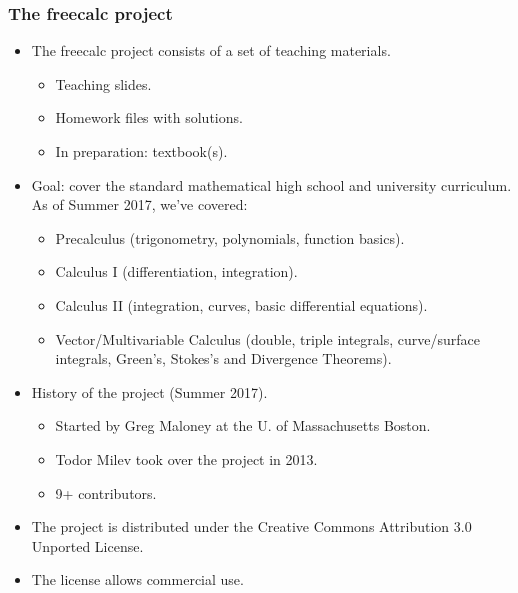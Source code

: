 \begin{frame}
\frametitle{The freecalc project}
\begin{itemize}
\item The freecalc project consists of a set of teaching materials.
\begin{itemize}
\item Teaching slides.
\item Homework files with solutions.
\item In preparation: textbook(s).
\end{itemize}
\item Goal: cover the standard mathematical high school and university curriculum. As of Summer 2017, we've covered:
\begin{itemize}
\item Precalculus (trigonometry, polynomials, function basics).
\item Calculus I (differentiation, integration).
\item Calculus II (integration, curves, basic differential equations).
\item Vector/Multivariable Calculus (double, triple integrals, curve/surface integrals, Green's, Stokes's and Divergence Theorems).
\end{itemize}
\item History of the project (Summer 2017).
\begin{itemize}
\item Started by Greg Maloney at the U. of Massachusetts Boston.
\item Todor Milev took over the project in 2013. 
\item 9+ contributors. 
\end{itemize}
\item The project is distributed under the Creative Commons Attribution 3.0 Unported License. 
\item The license allows commercial use.
\end{itemize}
\end{frame}